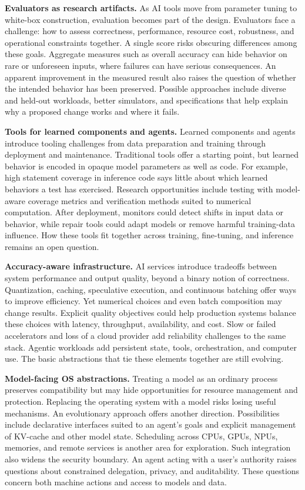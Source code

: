 \documentclass[manuscript]{acmart}
\begin{document}
\textbf{Evaluators as research artifacts.}
As AI tools move from parameter tuning to white-box construction,
evaluation becomes part of the design.
Evaluators face a challenge: how to assess correctness, performance, resource cost, robustness, and operational constraints together.
A single score risks obscuring differences among these goals.
Aggregate measures such as overall accuracy can hide behavior on rare or unforeseen inputs, where failures can have serious consequences.
An apparent improvement in the measured result also raises the question of whether the intended behavior has been preserved.
Possible approaches include diverse and held-out workloads, better simulators,
and specifications that help explain why a proposed change works and where it fails.

\textbf{Tools for learned components and agents.}
Learned components and agents introduce tooling challenges from data preparation and training through deployment and maintenance.
Traditional tools offer a starting point, but learned behavior is encoded in opaque model parameters as well as code.
For example, high statement coverage in inference code says little about which learned behaviors a test has exercised.
Research opportunities include testing with model-aware coverage metrics and verification methods suited to numerical computation.
After deployment, monitors could detect shifts in input data or behavior, while repair tools could adapt models or remove harmful training-data influence.
How these tools fit together across training, fine-tuning, and inference remains an open question.

\textbf{Accuracy-aware infrastructure.} AI services introduce tradeoffs between system performance and output quality, beyond a binary notion of correctness.
Quantization, caching, speculative execution, and continuous batching offer ways to improve efficiency.
Yet numerical choices and even batch composition may change results.
Explicit quality objectives could help production systems balance these choices with latency, throughput, availability, and cost.
Slow or failed accelerators and loss of a cloud provider add reliability challenges to the same stack.
Agentic workloads add persistent state, tools, orchestration, and computer use.
The basic abstractions that tie these elements together are still evolving.

\textbf{Model-facing OS abstractions.} Treating a model as an ordinary process preserves compatibility
but may hide opportunities for resource management and protection.
Replacing the operating system with a model risks losing useful mechanisms.
An evolutionary approach offers another direction.
Possibilities include declarative interfaces suited to an agent's goals and explicit management of KV-cache and other model state.
Scheduling across CPUs, GPUs, NPUs, memories, and remote services is another area for exploration.
Such integration also widens the security boundary.
An agent acting with a user's authority raises questions about constrained delegation, privacy, and auditability.
These questions concern both machine actions and access to models and data.
\end{document}
